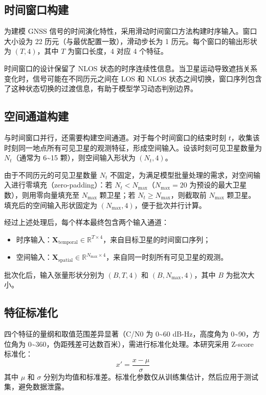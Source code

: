 \subsection{时间窗口构建}

    为建模 GNSS 信号的时间演化特性，采用滑动时间窗口方法构建时序输入。窗口大小设为 22 历元（与最优配置一致），滑动步长为 1 历元。每个窗口的输出形状为 $(T, 4)$，其中 $T$ 为窗口长度，4 对应 4 个特征。

    时间窗口的设计保留了 NLOS 状态的时序连续性信息。当卫星运动导致遮挡关系变化时，信号可能在不同历元之间在 LOS 和 NLOS 状态之间切换，窗口序列包含了这种状态切换的过渡信息，有助于模型学习动态判别边界。

\subsection{空间通道构建}

    与时间窗口并行，还需要构建空间通道。对于每个时间窗口的结束时刻 $t$，收集该时刻同一地点所有可见卫星的观测特征，形成空间输入。设该时刻可见卫星数量为 $N_t$（通常为 6{\textasciitilde}15 颗），则空间输入形状为 $(N_t, 4)$。

    由于不同历元的可见卫星数量 $N_t$ 不固定，为满足模型批量处理的需求，对空间输入进行零填充（zero-padding）：若 $N_t < N_{\max}$（$N_{\max}=20$ 为预设的最大卫星数），则用零向量填充至 $N_{\max}$ 颗卫星；若 $N_t \ge N_{\max}$，则截取前 $N_{\max}$ 颗卫星。填充后的空间输入形状固定为 $(N_{\max}, 4)$，便于批次并行计算。

    经过上述处理后，每个样本最终包含两个输入通道：
    \begin{itemize}
        \item 时序输入：$\bm{X}_{\text{temporal}} \in \mathbb{R}^{T \times 4}$，来自目标卫星的时间窗口序列；
        \item 空间输入：$\bm{X}_{\text{spatial}} \in \mathbb{R}^{N_{\max} \times 4}$，来自同一时刻所有可见卫星的观测。
    \end{itemize}
    批次化后，输入张量形状分别为 $(B, T, 4)$ 和 $(B, N_{\max}, 4)$，其中 $B$ 为批次大小。

\subsection{特征标准化}

    四个特征的量纲和取值范围差异显著（C/N0 为 0{\textasciitilde}60 dB-Hz，高度角为 0{\textasciitilde}90\textdegree，方位角为 0{\textasciitilde}360\textdegree，伪距残差可达数百米），需进行标准化处理。本研究采用 Z-score 标准化：
    \begin{equation}
    x' = \frac{x - \mu}{\sigma}
    \end{equation}
    其中 $\mu$ 和 $\sigma$ 分别为均值和标准差。标准化参数仅从训练集估计，然后应用于测试集，避免数据泄露。

